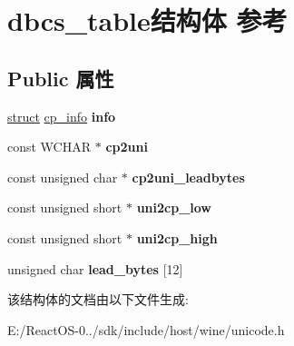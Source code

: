 \hypertarget{structdbcs__table}{}\section{dbcs\+\_\+table结构体 参考}
\label{structdbcs__table}
\subsection*{Public 属性}
\begin{DoxyCompactItemize}
\item 
\mbox{\label{structdbcs__table_aa18dd2f2570a0e665cf6f19376155f55}} 
\hyperlink{interfacestruct}{struct} \hyperlink{structcp__info}{cp\+\_\+info} {\bfseries info}
\item 
\mbox{\label{structdbcs__table_a2337c03ec58b4924711adcd90d07b2ce}} 
const W\+C\+H\+AR $\ast$ {\bfseries cp2uni}
\item 
\mbox{\label{structdbcs__table_a8deff76a9762f6288538ca36fda154d1}} 
const unsigned char $\ast$ {\bfseries cp2uni\+\_\+leadbytes}
\item 
\mbox{\label{structdbcs__table_a8a0b1a208ee83e56e764174d31e229fc}} 
const unsigned short $\ast$ {\bfseries uni2cp\+\_\+low}
\item 
\mbox{\label{structdbcs__table_a57342cae0ff396792cdb8d2aead0be87}} 
const unsigned short $\ast$ {\bfseries uni2cp\+\_\+high}
\item 
\mbox{\label{structdbcs__table_a363281b96d5c984414d6663769be4a00}} 
unsigned char {\bfseries lead\+\_\+bytes} \mbox{[}12\mbox{]}
\end{DoxyCompactItemize}


该结构体的文档由以下文件生成\+:\begin{DoxyCompactItemize}
\item 
E\+:/\+React\+O\+S-\/0../sdk/include/host/wine/unicode.\+h\end{DoxyCompactItemize}
